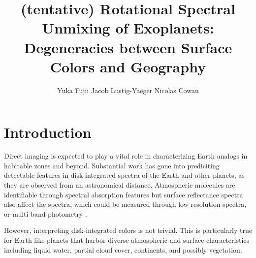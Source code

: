\documentclass[iop,numberedappendix,apj,]{emulateapj}
\begin{document}
\title{(tentative) Rotational Spectral Unmixing of Exoplanets: Degeneracies between Surface Colors and Geography}


\author{
%
Yuka Fujii 
%
Jacob Lustig-Yaeger 
%
Nicolas Cowan 
%
}

      
  
  



\vspace{0.5\baselineskip}


\begin{abstract}

\end{abstract}

  



\section{Introduction}
\label{sec:intro}

Direct imaging is expected to play a vital role in characterizing Earth analogs in habitable zones and beyond. 
Substantial work has gone into prediciting detectable features in disk-integrated spectra of the Earth and other planets, as they are observed from an astronomical distance. 
Atmospheric molecules are identifiable through spectral absorption features \citep[e.g.,][]{DesMarais2002} but surface reflectance spectra also affect the spectra, which could be measured through low-resolution spectra, or multi-band photometry \citep[e.g.,][]{Ford2001}. 

However, interpreting disk-integrated colors is not trivial. 
This is particularly true for Earth-like planets that harbor diverse atmospheric and surface characteristics including liquid water, partial cloud cover, continents, and possibly vegetation. 
\end{document}

